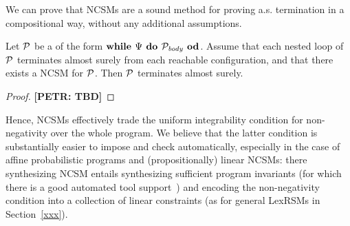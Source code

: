 We can prove that NCSMs are a sound method for proving a.s. termination in a compositional way, without any additional assumptions.

\begin{theorem}
Let $\mathcal{P}$ be a \PP{} of the form $\textbf{while } \Psi \textbf{ do } 
\mathcal{P}_{\mathit{body}} \textbf{ od}$. Assume that each nested loop of $\mathcal{P}$ terminates almost surely from each reachable configuration, and that there exists a NCSM for $\mathcal{P}$. Then $\mathcal{P}$ terminates almost surely.
\end{theorem}
\begin{proof}
\textbf{[PETR: TBD]}
\end{proof}

Hence, NCSMs effectively trade the uniform integrability condition for non-negativity over the whole program. We believe that the latter condition is substantially easier to impose and check automatically, especially in the case of affine probabilistic programs and (propositionally) linear NCSMs: there synthesizing NCSM entails synthesizing sufficient program invariants (for which there is a good automated tool support~\cite{xxx}) and encoding the non-negativity condition into a collection of linear constraints (as for general LexRSMs in Section~\ref{xxx}). 






